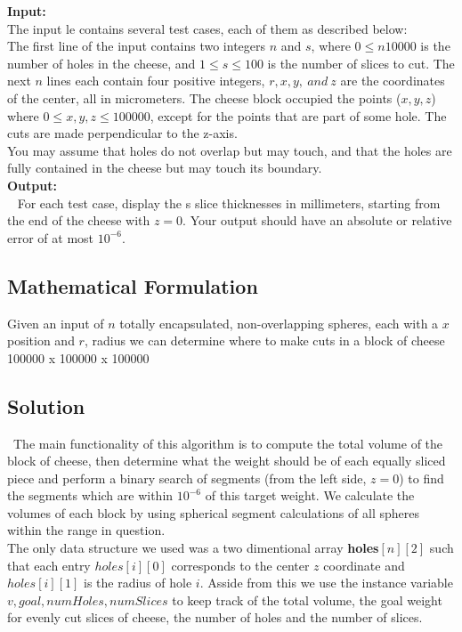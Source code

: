 \documentclass[12pt]{article}
\begin{document}
\noindent \textbf{Input:} \\
The input  le contains several test cases, each of them as described below: \\
\indent The first line of the input contains two integers $n$ and $s$, where $0 \leq n 10000$ is the number of
holes in the cheese, and $1 \leq s \leq 100$ is the number of slices to cut. The next $n$ lines each contain four
positive integers, $r, x, y,\ and\ z$ are the coordinates of the center, all in micrometers. The cheese block
occupied the points ($x, y, z$) where $0 \leq x, y, z \leq 100000$, except for the points that are part of
some hole. The cuts are made perpendicular to the z-axis. \\
\indent You may assume that holes do not overlap but may touch, and that the holes are fully contained
in the cheese but may touch its boundary. \\

\noindent \textbf{Output:} \\
~ \indent For each test case, display the s slice thicknesses in millimeters, starting from the end of the cheese
with $z = 0$. Your output should have an absolute or relative error of at most $10^{-6}$.




\newpage

\subsection{Mathematical Formulation}
Given an input of $n$ totally encapsulated, non-overlapping spheres, each with a $x$ position and $r$, radius we
can determine where to make cuts in a block of cheese 100000 x 100000 x 100000


\subsection{Solution}
~\indent The main functionality of this algorithm is to compute the total volume of the block of cheese, then determine
what the weight should be of each equally sliced piece and perform a binary search of segments (from the left
side, $z = 0$) to find the segments which are within $10^{-6}$ of this target weight. We calculate the volumes
of each block by using spherical segment calculations of all spheres within the range in question. \\
\indent The only data structure we used was a two dimentional array \textbf{holes$[n][2]$} such that
each entry $holes[i][0]$ corresponds to the center $z$ coordinate and $holes[i][1]$ is the radius of hole $i$.
Asside from this we use the instance variable $v, goal, numHoles, numSlices$ to keep track of the total volume,
the goal weight for evenly cut slices of cheese, the number of holes and the number of slices.
\end{document}

